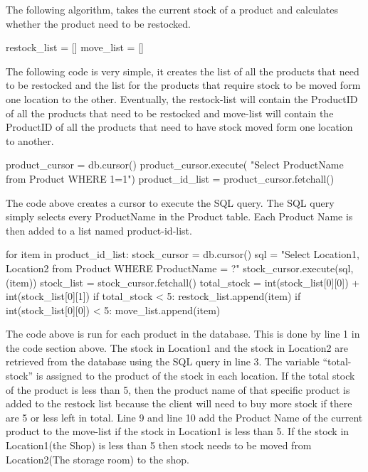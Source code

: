 \begin{python}
The following algorithm, takes the current stock of a product and calculates whether the product need to be restocked.


\begin{python}
restock_list = []
move_list = []
\end{python}

The following code is very simple, it creates the list of all the products that need to be restocked and the list for the products that require stock to be moved form one location to the other. Eventually, the restock-list will contain the ProductID of all the products that need to be restocked and move-list will contain the ProductID of all the products that need to have stock moved form one location to another.


\begin{python}
product_cursor = db.cursor()
product_cursor.execute( "Select ProductName from Product WHERE 1=1")
product_id_list = product_cursor.fetchall()
\end{python}

The code above creates a cursor to execute the SQL query. The SQL query simply selects every ProductName in the Product table. Each Product Name is then added to a list named product-id-list. 

\begin{python}
for item in product_id_list:
            stock_cursor = db.cursor()
            sql = "Select Location1, Location2 from Product WHERE ProductName = ?"
            stock_cursor.execute(sql, (item))
            stock_list = stock_cursor.fetchall()
            total_stock = int(stock_list[0][0]) + int(stock_list[0][1])
            if total_stock < 5:
                restock_list.append(item)
            if int(stock_list[0][0]) < 5:
                move_list.append(item)
\end{python}

The code above is run for each product in the database. This is done by line 1 in the code section above. The stock in Location1 and the stock in Location2 are retrieved from the database using the SQL query in line 3. The variable ``total-stock'' is assigned to the product of the stock in each location. If the total stock of the product is less than 5, then the product name of that specific product is added to the restock list because the client will need to buy more stock if there are 5 or less left in total. Line 9 and line 10 add the Product Name of the current product to the move-list if the stock in Location1 is less than 5. If the stock in Location1(the Shop) is less than 5 then stock needs to be moved from Location2(The storage room) to the shop.


\end{python}
